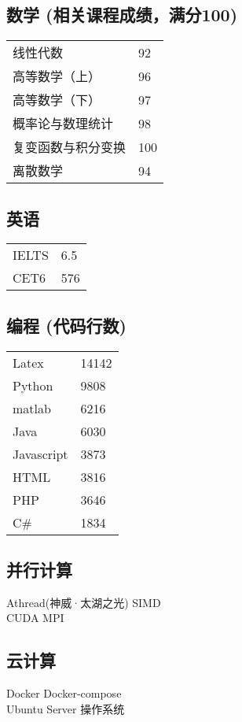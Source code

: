 \documentclass[]{deedy-resume-openfont}
\begin{document}
\begin{minipage}[t]{0.25\textwidth}
	\subsection{数学 {\small (相关课程成绩，满分100)}}
	\begin{tabular}{ll}
		线性代数           & 92  \\
		高等数学（上）     & 96  \\
		高等数学（下）     & 97  \\
		概率论与数理统计   & 98  \\
		复变函数与积分变换 & 100 \\
		离散数学 &94\\
	\end{tabular}
	\sectionsep
	\subsection{英语}
	\begin{tabular}{ll}
		IELTS & 6.5 \\
		CET6  & 576 \\
	\end{tabular}
	\sectionsep
	\subsection{编程 {\small (代码行数)}}
	\begin{tabular}{ll}
		Latex      & 14142  \\
		Python     & 9808  \\
		matlab     & 6216  \\
		Java       & 6030  \\
		Javascript & 3873  \\
		HTML       & 3816  \\
		PHP        & 3646  \\
		C\#        & 1834  \\
	\end{tabular}
	\sectionsep
    
	\subsection{并行计算}
	Athread(神威·太湖之光) \textbullet{} SIMD \\
	CUDA \textbullet{} MPI \\
    \sectionsep
    
	\subsection{云计算}
	Docker \textbullet{} Docker-compose \\
	Ubuntu Server 操作系统\\
	\sectionsep


\end{minipage}
\end{document}

